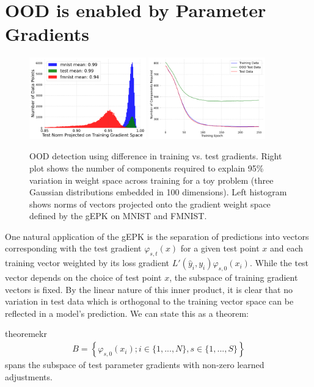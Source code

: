 \section{OOD is enabled by Parameter Gradients}
\label{sec:ood}
\begin{figure}[h]
\begin{center}
\includegraphics[width=0.45\textwidth]{c4a_figures/grad_alignment_hist.pdf}
\includegraphics[width=0.45\textwidth]{c4a_figures/ood_noise.pdf}
\end{center}
\caption{OOD detection using difference in training vs. test gradients. Right plot shows the number of components required to explain 95\% variation in weight space across training for a toy problem (three Gaussian distributions embedded in 100 dimensions). Left histogram shows norms of vectors projected onto the gradient weight space defined by the gEPK on MNIST and FMNIST.}
\label{fig:ood}
\end{figure}
One natural application of the gEPK is the separation of predictions into vectors corresponding with the test gradient $\varphi_{s,t}(x)$ for a given test point $x$ and each training vector  weighted by its loss gradient $L'(\hat y_i, y_i) \varphi_{s, 0}(x_i)$. While the test vector depends on the choice of test point $x$, the subspace of training gradient vectors is fixed. By the linear nature of this inner product, it is clear that no variation in test data which is orthogonal to the training vector space can be reflected in a model's prediction. We can state this as a theorem:
\begin{restatable}{theorem}{ekr}
\label{thm:oodspan}
\begin{align}
    B = \left\{\varphi_{s, 0}(x_i); i \in \{1,...,N\}, s \in \{1,...,S\}\right\}
\end{align}
spans the subspace of test parameter gradients with non-zero learned adjustments. 
\end{restatable}
